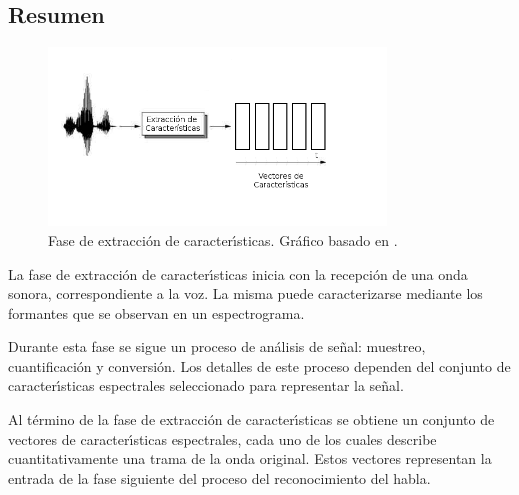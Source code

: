 \subsection{Resumen}

\begin{figure}[H] 
\centering
\includegraphics[width=0.8\textwidth]{./graphics/extraccion.png}
\caption{Fase de extracci\'on de caracter{\'\i}sticas. Gr\'afico basado en \cite{VerenichASR}.}
\label{figure:hmm}
\end{figure}

La fase de extracci\'on de caracter{\'\i}sticas inicia con la recepci\'on de una onda sonora,
correspondiente a la voz.
La misma puede caracterizarse mediante los formantes que se observan en un espectrograma.

Durante esta fase se sigue un proceso de an\'alisis de se\~nal: muestreo, cuantificaci\'on y conversi\'on.
Los detalles de este proceso dependen del conjunto de caracter{\'\i}sticas espectrales seleccionado 
para representar la se\~nal.

Al t\'ermino de la fase de extracci\'on de caracter{\'\i}sticas se obtiene un conjunto de vectores 
de caracter{\'\i}sticas espectrales, cada uno de los cuales describe cuantitativamente una trama de
la onda original. Estos vectores representan la entrada de la fase siguiente del proceso del reconocimiento del habla.